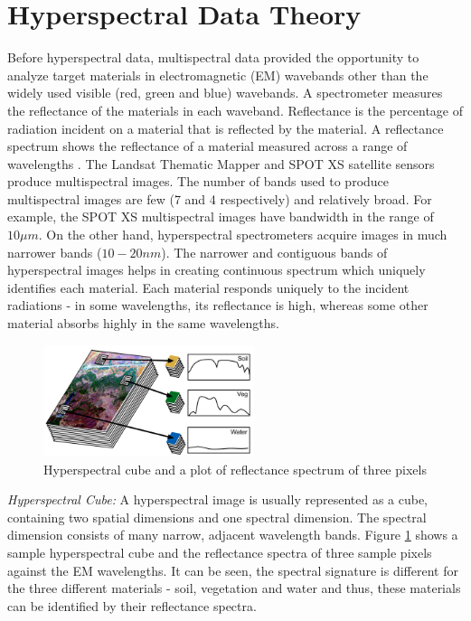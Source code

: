 \documentclass[12pt,twoside]{article}
\theoremstyle{plain}
\theoremstyle{definition}
\theoremstyle{remark}
\newcommand{\forceindent}{\leavevmode{\parindent=2em\indent}}
\begin{document}
\section{Hyperspectral Data Theory}
\label{sec:HypTheo}
Before hyperspectral data, multispectral data provided the opportunity to analyze target materials in electromagnetic (EM) wavebands other than the widely used visible (red, green and blue) wavebands. A spectrometer measures the reflectance of the materials in each waveband. Reflectance is the percentage of radiation incident on a material that is reflected by the material. A reflectance spectrum shows the reflectance of a material measured across a range of wavelengths \cite{shippert2003introduction}. The Landsat Thematic Mapper and SPOT XS satellite sensors produce multispectral images. The number of bands used to produce multispectral images are few (7 and 4 respectively) and relatively broad. For example, the SPOT XS multispectral images have bandwidth in the range of $10 \mu m$. On the other hand, hyperspectral spectrometers acquire images in much narrower bands ($10-20nm$). The narrower and contiguous bands of hyperspectral images helps in creating continuous spectrum which uniquely identifies each material. Each material responds uniquely to the incident radiations - in some wavelengths, its reflectance is high, whereas some other material absorbs highly in the same wavelengths.\\
\begin{figure}
\includegraphics[width=0.55\textwidth]{src/Hyperspectral_cube.png}
\caption{Hyperspectral cube and a plot of reflectance spectrum of three pixels \cite{shippert2003introduction}}
\label{fig:hyp_cube}
\end{figure}
\forceindent \textit{Hyperspectral Cube:} A hyperspectral image is usually represented as a cube, containing two spatial dimensions and one spectral dimension. The spectral dimension consists of many narrow, adjacent wavelength bands. Figure \ref{fig:hyp_cube} shows a sample hyperspectral cube and the reflectance spectra of three sample pixels against the EM wavelengths. It can be seen, the spectral signature is different for the three different materials - soil, vegetation and water and thus, these materials can be identified by their reflectance spectra.
\end{document}
